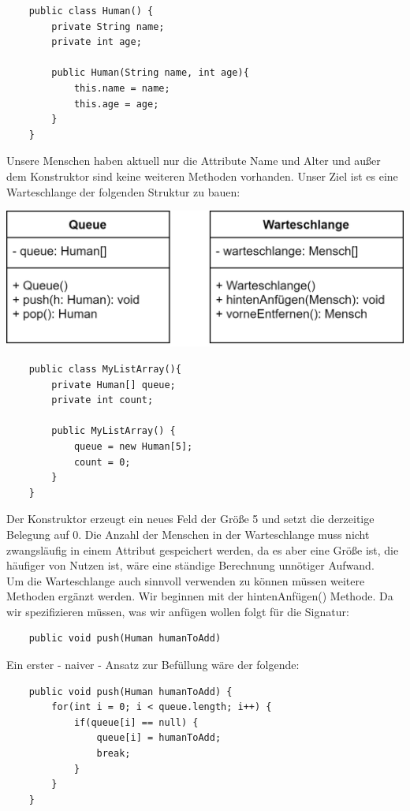 \documentclass{article}
\begin{document}
\begin{verbatim}
    public class Human() {
        private String name;
        private int age; 
    
        public Human(String name, int age){
            this.name = name;
            this.age = age;
        }
    }
\end{verbatim}
Unsere Menschen haben aktuell nur die Attribute Name und Alter und außer dem Konstruktor sind keine weiteren
Methoden vorhanden. Unser Ziel ist es eine Warteschlange der folgenden Struktur zu bauen: \\
\begin{center}
    \includegraphics[scale=0.25]{../media/queue_diagramm.png}
\end{center}

\begin{verbatim}
    public class MyListArray(){
        private Human[] queue;
        private int count;

        public MyListArray() {
            queue = new Human[5];
            count = 0;
        }
    }
\end{verbatim}
Der Konstruktor erzeugt ein neues Feld der Größe 5 und setzt die derzeitige Belegung auf 0. Die Anzahl der 
Menschen in der Warteschlange muss nicht zwangsläufig in einem Attribut gespeichert werden, da es aber eine 
Größe ist, die häufiger von Nutzen ist, wäre eine ständige Berechnung unnötiger Aufwand.  \\
Um die Warteschlange auch sinnvoll verwenden zu können müssen weitere Methoden ergänzt werden. Wir beginnen mit der hintenAnfügen() Methode. Da wir spezifizieren müssen, was wir anfügen wollen folgt für die Signatur:
\begin{verbatim}
    public void push(Human humanToAdd) 
\end{verbatim}
Ein erster - naiver - Ansatz zur Befüllung wäre der folgende: 
\begin{verbatim}
    public void push(Human humanToAdd) {
        for(int i = 0; i < queue.length; i++) {
            if(queue[i] == null) {
                queue[i] = humanToAdd;
                break;
            }
        }
    }
\end{verbatim}
\end{document}
